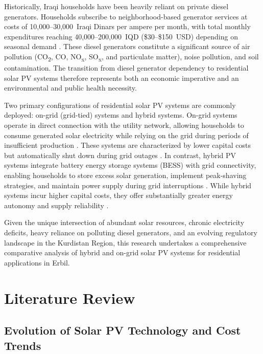 Historically, Iraqi households have been heavily reliant on private diesel generators. Households subscribe to neighborhood-based generator services at costs of 10,000--30,000~Iraqi Dinars per ampere per month, with total monthly expenditures reaching 40,000--200,000~IQD (\$30--\$150~USD) depending on seasonal demand \cite{rudaw2024,intechopen2023}. These diesel generators constitute a significant source of air pollution (CO\textsubscript{2}, CO, NO\textsubscript{x}, SO\textsubscript{x}, and particulate matter), noise pollution, and soil contamination. The transition from diesel generator dependency to residential solar PV systems therefore represents both an economic imperative and an environmental and public health necessity.

Two primary configurations of residential solar PV systems are commonly deployed: on-grid (grid-tied) systems and hybrid systems. On-grid systems operate in direct connection with the utility network, allowing households to consume generated solar electricity while relying on the grid during periods of insufficient production \cite{lund2008}. These systems are characterized by lower capital costs but automatically shut down during grid outages \cite{enphase2024}. In contrast, hybrid PV systems integrate battery energy storage systems (BESS) with grid connectivity, enabling households to store excess solar generation, implement peak-shaving strategies, and maintain power supply during grid interruptions \cite{zakeri2015}. While hybrid systems incur higher capital costs, they offer substantially greater energy autonomy and supply reliability \cite{lund2025}.

Given the unique intersection of abundant solar resources, chronic electricity deficits, heavy reliance on polluting diesel generators, and an evolving regulatory landscape in the Kurdistan Region, this research undertakes a comprehensive comparative analysis of hybrid and on-grid solar PV systems for residential applications in Erbil.


\section{Literature Review}

\subsection{Evolution of Solar PV Technology and Cost Trends}

